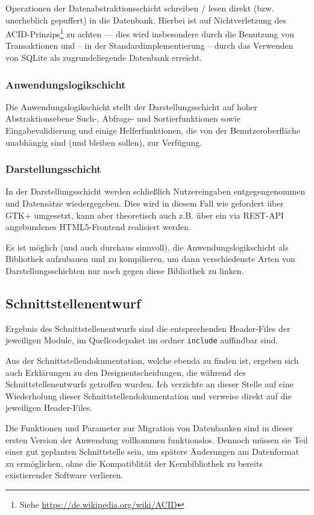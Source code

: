 Operationen der Datenabstraktionsschicht schreiben / lesen direkt (bzw. unerheblich
gepuffert) in die Datenbank. Hierbei ist auf Nichtverletzung des ACID-Prinzips\footnote{Siehe
\url{https://de.wikipedia.org/wiki/ACID}} zu achten --- dies wird insbesondere durch die Benutzung
von Transaktionen und -- in der Standardimplementierung -- durch das Verwenden von SQLite als
zugrundeliegende Datenbank erreicht.

\subsubsection{Anwendungslogikschicht}
Die Anwendungslogikschicht stellt der Darstellungsschicht auf hoher Abstraktionsebene Such-, Abfrage-
und Sortierfunktionen sowie Eingabevalidierung und einige Helferfunktionen, die von der Benutzeroberfläche
unabhängig sind (und bleiben sollen), zur Verfügung.

\subsubsection{Darstellungsschicht}
In der Darstellungsschicht werden schließlich Nutzereingaben entgegengenommen und
Datensätze wiedergegeben. Dies wird in diesem Fall wie gefordert über GTK+ umgesetzt,
kann aber theoretisch auch z.B. über ein via REST-API angebundenes HTML5-Frontend
realisiert werden.

Es ist möglich (und auch durchaus sinnvoll), die Anwendungslogikschicht als Bibliothek
aufzubauen und zu kompilieren, um dann verschiedenste Arten von Darstellungsschichten
nur noch gegen diese Bibliothek zu linken.

\subsection{Schnittstellenentwurf}
Ergebnis des Schnittstellenentwurfs sind die entsprechenden Header-Files der jeweiligen Module,
im Quellcodepaket im ordner \lstinline{include} auffindbar sind.

Aus der Schnittstellendokumentation, welche ebenda zu finden ist, ergeben sich auch Erklärungen zu
den Designentscheidungen, die während des Schnittstellenentwurfs getroffen wurden.
Ich verzichte an dieser Stelle auf eine Wiederholung dieser Schnittstellendokumentation und verweise
direkt auf die jeweiligen Header-Files.

Die Funktionen und Parameter zur Migration von Datenbanken sind in dieser ersten Version der Anwendung
vollkommen funktionslos. Dennoch müssen sie Teil einer gut geplanten Schnittstelle sein, um spätere
Änderungen am Datenformat zu ermöglichen, ohne die Kompatiblität der Kernbibliothek zu bereits existierender
Software verlieren.

